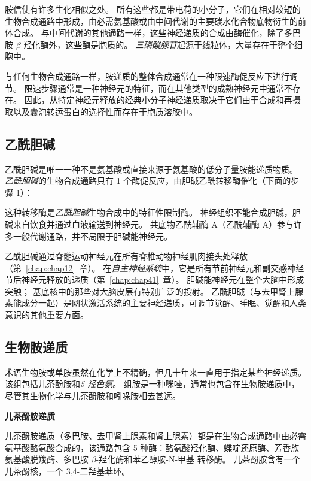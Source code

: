 胺信使有许多生化相似之处。
所有这些都是带电荷的小分子，它们在相对较短的生物合成通路中形成，由必需氨基酸或由中间代谢的主要碳水化合物底物衍生的前体合成。
与中间代谢的其他通路一样，这些神经递质的合成由酶催化，除了多巴胺 $\beta$-羟化酶外，这些酶是胞质的。
\textit{三磷酸腺苷}起源于线粒体，大量存在于整个细胞中。


与任何生物合成通路一样，胺递质的整体合成通常在一种限速酶促反应下进行调节。
限速步骤通常是一种神经元的特征，而在其他类型的成熟神经元中通常不存在。
因此，从特定神经元释放的经典小分子神经递质取决于它们由于合成和再摄取以及囊泡转运蛋白的选择性而存在于胞质溶胶中。



\subsection{乙酰胆碱}

乙酰胆碱是唯一一种不是氨基酸或直接来源于氨基酸的低分子量胺能递质物质。
\textit{乙酰胆碱}的生物合成通路只有 1 个酶促反应，由胆碱乙酰转移酶催化（下面的步骤 1）：


这种转移酶是\textit{乙酰胆碱}生物合成中的特征性限制酶。
神经组织不能合成胆碱，胆碱来自饮食并通过血液输送到神经元。
共底物乙酰辅酶 A（乙酰辅酶 A）参与许多一般代谢通路，并不局限于胆碱能神经元。


乙酰胆碱通过脊髓运动神经元在所有脊椎动物神经肌肉接头处释放（第~\ref{chap:chap12}~章）。
在\textit{自主神经系统}中，它是所有节前神经元和副交感神经节后神经元释放的递质（第~\ref{chap:chap41}~章）。
胆碱能神经元在整个大脑中形成突触；
基底核中的那些对大脑皮层有特别广泛的投射。
乙酰胆碱（与去甲肾上腺素能成分一起）是网状激活系统的主要神经递质，可调节觉醒、睡眠、觉醒和人类意识的其他重要方面。




\subsection{生物胺递质}

术语生物胺或单胺虽然在化学上不精确，但几十年来一直用于指定某些神经递质。
该组包括儿茶酚胺和\textit{5-羟色氨}。
组胺是一种咪唑，通常也包含在生物胺递质中，尽管其生物化学与儿茶酚胺和吲哚胺相去甚远。


\textbf{儿茶酚胺递质}

儿茶酚胺递质（多巴胺、去甲肾上腺素和肾上腺素）都是在生物合成通路中由必需氨基酸酪氨酸合成的，该通路包含 5 种酶：酪氨酸羟化酶、蝶啶还原酶、芳香族氨基酸脱羧酶、多巴胺 $\beta$-羟化酶和苯乙醇胺-N-甲基 转移酶。
儿茶酚胺含有一个儿茶酚核，一个 3,4-二羟基苯环。


